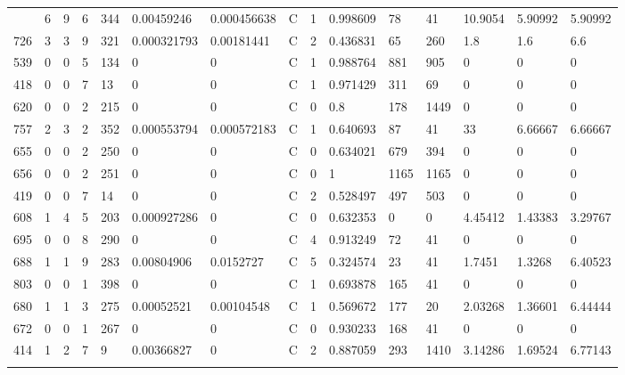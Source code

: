 \begin{latin}
\begin{longtable}{lllllllllllllll}
\begin{comment}
	749 & 6  & 9   & 6  & 344 & 0.00459246     & 0.000456638    & C & 1  & 0.998609 & 78   & 41   & 10.9054 & 5.90992 & 5.90992 \\
	726 & 3  & 3   & 9  & 321 & 0.000321793    & 0.00181441     & C & 2  & 0.436831 & 65   & 260  & 1.8     & 1.6     & 6.6     \\
	539 & 0  & 0   & 5  & 134 & 0              & 0              & C & 1  & 0.988764 & 881  & 905  & 0       & 0       & 0       \\
	418 & 0  & 0   & 7  & 13  & 0              & 0              & C & 1  & 0.971429 & 311  & 69   & 0       & 0       & 0       \\
	620 & 0  & 0   & 2  & 215 & 0              & 0              & C & 0  & 0.8      & 178  & 1449 & 0       & 0       & 0       \\
	757 & 2  & 3   & 2  & 352 & 0.000553794    & 0.000572183    & C & 1  & 0.640693 & 87   & 41   & 33      & 6.66667 & 6.66667 \\
	655 & 0  & 0   & 2  & 250 & 0              & 0              & C & 0  & 0.634021 & 679  & 394  & 0       & 0       & 0       \\
	656 & 0  & 0   & 2  & 251 & 0              & 0              & C & 0  & 1        & 1165 & 1165 & 0       & 0       & 0       \\
	419 & 0  & 0   & 7  & 14  & 0              & 0              & C & 2  & 0.528497 & 497  & 503  & 0       & 0       & 0       \\
	608 & 1  & 4   & 5  & 203 & 0.000927286    & 0              & C & 0  & 0.632353 & 0    & 0    & 4.45412 & 1.43383 & 3.29767 \\
	695 & 0  & 0   & 8  & 290 & 0              & 0              & C & 4  & 0.913249 & 72   & 41   & 0       & 0       & 0       \\
	688 & 1  & 1   & 9  & 283 & 0.00804906     & 0.0152727      & C & 5  & 0.324574 & 23   & 41   & 1.7451  & 1.3268  & 6.40523 \\
	803 & 0  & 0   & 1  & 398 & 0              & 0              & C & 1  & 0.693878 & 165  & 41   & 0       & 0       & 0       \\
	680 & 1  & 1   & 3  & 275 & 0.00052521     & 0.00104548     & C & 1  & 0.569672 & 177  & 20   & 2.03268 & 1.36601 & 6.44444 \\
	672 & 0  & 0   & 1  & 267 & 0              & 0              & C & 0  & 0.930233 & 168  & 41   & 0       & 0       & 0       \\
	414 & 1  & 2   & 7  & 9   & 0.00366827     & 0              & C & 2  & 0.887059 & 293  & 1410 & 3.14286 & 1.69524 & 6.77143 \\

\end{comment}
\end{longtable}
\end{latin}
